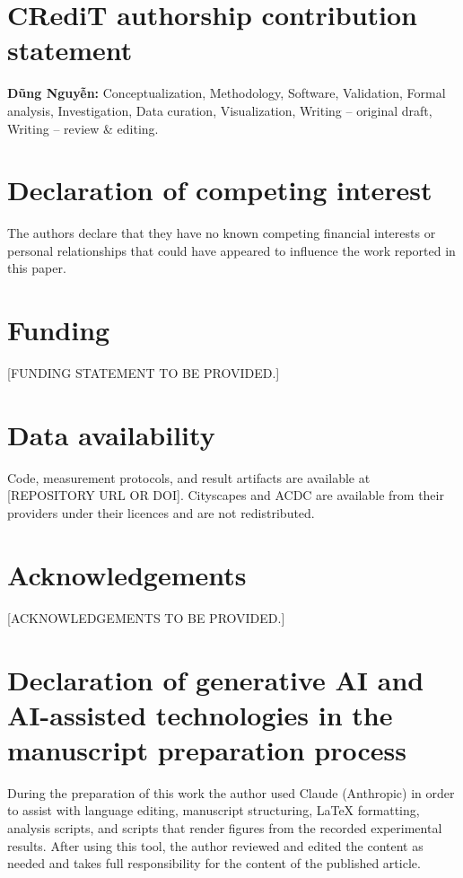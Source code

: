 \documentclass[a4paper,5p]{elsarticle}
\begin{document}
\section*{CRediT authorship contribution statement}

\textbf{Dũng Nguyễn:} Conceptualization, Methodology, Software, Validation, Formal analysis, Investigation, Data curation, Visualization, Writing -- original draft, Writing -- review \& editing.

\section*{Declaration of competing interest}

The authors declare that they have no known competing financial interests or personal relationships that could have appeared to influence the work reported in this paper.

\section*{Funding}

[FUNDING STATEMENT TO BE PROVIDED.]

\section*{Data availability}

Code, measurement protocols, and result artifacts are available at [REPOSITORY URL OR DOI]. Cityscapes and ACDC are available from their providers under their licences and are not redistributed.

\section*{Acknowledgements}

[ACKNOWLEDGEMENTS TO BE PROVIDED.]

\section*{Declaration of generative AI and AI-assisted technologies in the manuscript preparation process}

During the preparation of this work the author used Claude (Anthropic) in order to assist with language editing, manuscript structuring, LaTeX formatting, analysis scripts, and scripts that render figures from the recorded experimental results. After using this tool, the author reviewed and edited the content as needed and takes full responsibility for the content of the published article.



\end{document}
